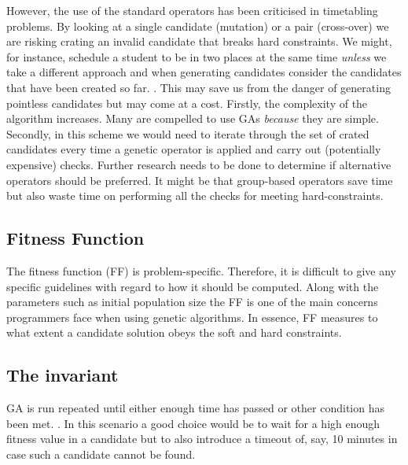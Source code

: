 \documentclass[a4paper, 12pt, titlepage]{article}
\begin{document}
However, the use of the standard operators has been criticised in
timetabling problems.  By looking at a single candidate (mutation) or a
pair (cross-over) we are risking crating an invalid candidate that breaks
hard constraints. We might, for instance, schedule a student to be in two
places at the same time \emph{unless} we take a different approach and
when generating candidates consider the candidates that have been created
so far. \cite[p.~2506]{qaurooni2013}.  This may save us from the danger
of generating pointless candidates but may come at a cost. Firstly,
the complexity of the algorithm increases.  Many are compelled to
use GAs \emph{because} they are simple.  Secondly, in this scheme we
would need to iterate through the set of crated candidates every time a
genetic operator is applied and carry out (potentially expensive) checks.
Further research needs to be done to determine if alternative operators
should be preferred. It might be that group-based operators save time but
also waste time on performing all the checks for meeting hard-constraints.

\subsection*{Fitness Function}

The fitness function (FF) is problem-specific. Therefore, it is difficult
to give any specific guidelines with regard to how it should be
computed. Along with the parameters such as initial population size the
FF is one of the main concerns programmers face when using
genetic algorithms. In essence, FF measures to what
extent a candidate solution obeys the soft and hard constraints.




\subsection*{The invariant}


GA is run repeated until either enough time has passed or other condition
has been met. \cite[p.~108]{eberhart2007}. In this scenario a good choice
would be to wait for a high enough fitness value in a candidate but to
also introduce a timeout of, say, 10 minutes in case such a candidate
cannot be found.
\end{document}
